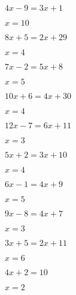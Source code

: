 \documentclass{ximera}
\begin{document}
\begin{exercise}
\begin{xmmulticols}
  \begin{question} \( 4x - 9  =  3x + 1     \) \begin{uitkomst} \( x  = 10 \) \end{uitkomst} \end{question}
  \begin{question} \( 8x + 5  =  2x + 29    \) \begin{uitkomst} \( x  = 4  \) \end{uitkomst} \end{question}
  \begin{question} \( 7x - 2  =  5x + 8     \) \begin{uitkomst} \( x  = 5  \) \end{uitkomst} \end{question}
  \begin{question} \( 10x + 6 =  4x + 30    \) \begin{uitkomst} \( x  = 4  \) \end{uitkomst} \end{question}
  \begin{question} \( 12x - 7 =  6x + 11    \) \begin{uitkomst} \( x  = 3  \) \end{uitkomst} \end{question}
  \begin{question} \( 5x + 2  =  3x + 10    \) \begin{uitkomst} \( x  = 4  \) \end{uitkomst} \end{question}
  \begin{question} \( 6x - 1  =  4x + 9     \) \begin{uitkomst} \( x  = 5  \) \end{uitkomst} \end{question}
  \begin{question} \( 9x - 8  =  4x + 7     \) \begin{uitkomst} \( x  = 3  \) \end{uitkomst} \end{question}
  \begin{question} \( 3x + 5  =  2x + 11    \) \begin{uitkomst} \( x  = 6  \) \end{uitkomst} \end{question}
  \begin{question} \( 4x + 2  =  10         \) \begin{uitkomst} \( x  = 2  \) \end{uitkomst} \end{question}

\end{xmmulticols}
\end{exercise}
\end{document}
